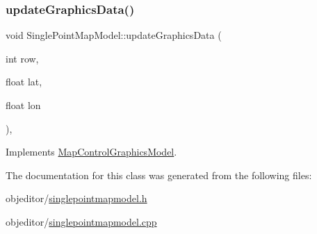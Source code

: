 \mbox{\label{class_single_point_map_model_a40912bf3b978c4185ac9f390c55d37d6}} 
\subsubsection{\texorpdfstring{updateGraphicsData()}{updateGraphicsData()}}
{\footnotesize\ttfamily void Single\+Point\+Map\+Model\+::update\+Graphics\+Data (\begin{DoxyParamCaption}\item[{int}]{row,  }\item[{float}]{lat,  }\item[{float}]{lon }\end{DoxyParamCaption})\hspace{0.3cm}{\ttfamily [override]}, {\ttfamily [virtual]}}



Implements \mbox{\hyperlink{class_map_control_graphics_model_ae5a590579987d471211cf59c61b1b54c}{Map\+Control\+Graphics\+Model}}.



The documentation for this class was generated from the following files\+:\begin{DoxyCompactItemize}
\item 
objeditor/\mbox{\hyperlink{singlepointmapmodel_8h}{singlepointmapmodel.\+h}}\item 
objeditor/\mbox{\hyperlink{singlepointmapmodel_8cpp}{singlepointmapmodel.\+cpp}}\end{DoxyCompactItemize}
